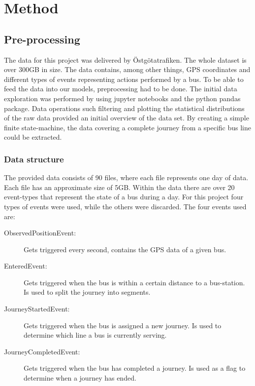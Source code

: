 
\chapter{Method}
\label{cha:method}

\section{Pre-processing}
The data for this project was delivered by Östgötatrafiken. The whole dataset is over 300GB in size. The data contains, among other things, GPS coordinates and different types of events representing actions performed by a bus. To be able to feed the data into our models, preprocessing had to be done. The initial data exploration was performed by using jupyter notebooks and the python pandas package. Data operations such filtering and plotting the statistical distributions of the raw data provided an initial overview of the data set. By creating a simple finite state-machine, the data covering a complete journey from a specific bus line could be extracted.


\subsection{Data structure}
The provided data consists of 90 files, where each file represents one day of data. Each file has an approximate size of 5GB. Within the data there are over 20 event-types that represent the state of a bus during a day. For this project four types of events were used, while the others were discarded. The four events used are:
\begin{description}
\item[ObservedPositionEvent:] Gets triggered every second, contains the GPS data of a given bus.
\item[EnteredEvent:] Gets triggered when the bus is within a certain distance to a bus-station. Is used to split the journey into segments.
\item[JourneyStartedEvent:] Gets triggered when the bus is assigned a new journey. Is used to determine which line a bus is currently serving.
\item[JourneyCompletedEvent:] Gets triggered when the bus has completed a journey. Is used as a flag to determine when a journey has ended.
\end{description}

